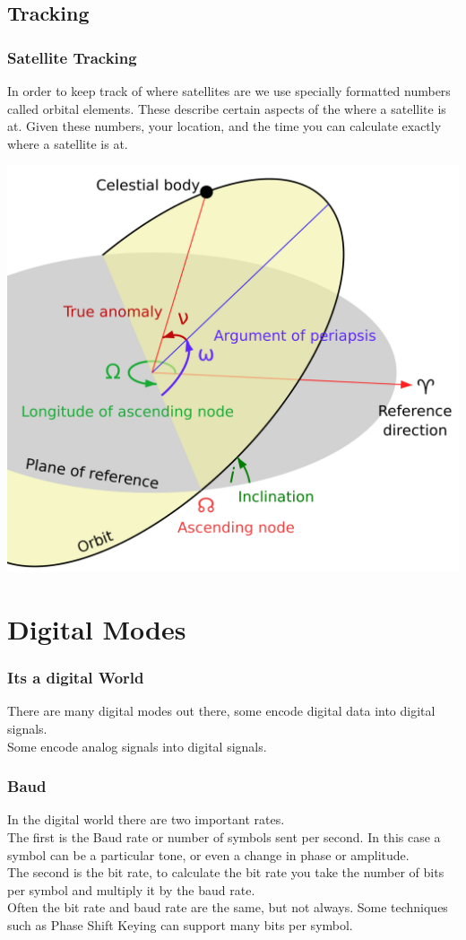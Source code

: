 \documentclass[10pt]{beamer}
\begin{document}
\subsection{Tracking}
\begin{frame}
\frametitle{Satellite Tracking}
In order to keep track of where satellites are we use specially formatted numbers called orbital elements. These describe certain aspects of the where a satellite is at. Given these numbers, your location, and the time you can calculate exactly where a satellite is at.
\begin{center}
\includegraphics[height=.5\textheight]{orbitelements.png}
\end{center}
\end{frame}

\section{Digital Modes}
\begin{frame}
\frametitle{Its a digital World}
There are many digital modes out there, some encode digital data into digital signals.\\
Some encode analog signals into digital signals.
\end{frame}

\begin{frame}
\frametitle{Baud}
In the digital world there are two important rates.\\
The first is the Baud rate or number of symbols sent per second. In this case a symbol can be a particular tone, or even a change in phase or amplitude.\\
The second is the bit rate, to calculate the bit rate you take the number of bits per symbol and multiply it by the baud rate.\\
Often the bit rate and baud rate are the same, but not always. Some techniques such as Phase Shift Keying can support many bits per symbol.
\end{frame}
\end{document}
